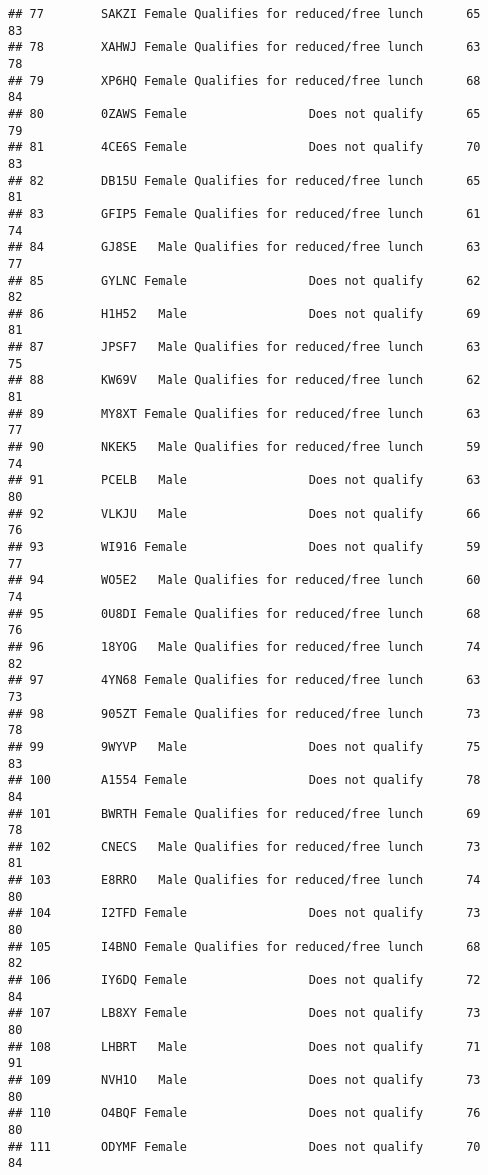 \documentclass[
]{article}
\begin{document}
\begin{verbatim}
## 77        SAKZI Female Qualifies for reduced/free lunch      65       83
## 78        XAHWJ Female Qualifies for reduced/free lunch      63       78
## 79        XP6HQ Female Qualifies for reduced/free lunch      68       84
## 80        0ZAWS Female                 Does not qualify      65       79
## 81        4CE6S Female                 Does not qualify      70       83
## 82        DB15U Female Qualifies for reduced/free lunch      65       81
## 83        GFIP5 Female Qualifies for reduced/free lunch      61       74
## 84        GJ8SE   Male Qualifies for reduced/free lunch      63       77
## 85        GYLNC Female                 Does not qualify      62       82
## 86        H1H52   Male                 Does not qualify      69       81
## 87        JPSF7   Male Qualifies for reduced/free lunch      63       75
## 88        KW69V   Male Qualifies for reduced/free lunch      62       81
## 89        MY8XT Female Qualifies for reduced/free lunch      63       77
## 90        NKEK5   Male Qualifies for reduced/free lunch      59       74
## 91        PCELB   Male                 Does not qualify      63       80
## 92        VLKJU   Male                 Does not qualify      66       76
## 93        WI916 Female                 Does not qualify      59       77
## 94        WO5E2   Male Qualifies for reduced/free lunch      60       74
## 95        0U8DI Female Qualifies for reduced/free lunch      68       76
## 96        18YOG   Male Qualifies for reduced/free lunch      74       82
## 97        4YN68 Female Qualifies for reduced/free lunch      63       73
## 98        905ZT Female Qualifies for reduced/free lunch      73       78
## 99        9WYVP   Male                 Does not qualify      75       83
## 100       A1554 Female                 Does not qualify      78       84
## 101       BWRTH Female Qualifies for reduced/free lunch      69       78
## 102       CNECS   Male Qualifies for reduced/free lunch      73       81
## 103       E8RRO   Male Qualifies for reduced/free lunch      74       80
## 104       I2TFD Female                 Does not qualify      73       80
## 105       I4BNO Female Qualifies for reduced/free lunch      68       82
## 106       IY6DQ Female                 Does not qualify      72       84
## 107       LB8XY Female                 Does not qualify      73       80
## 108       LHBRT   Male                 Does not qualify      71       91
## 109       NVH1O   Male                 Does not qualify      73       80
## 110       O4BQF Female                 Does not qualify      76       80
## 111       ODYMF Female                 Does not qualify      70       84

\end{verbatim}
\end{document}
